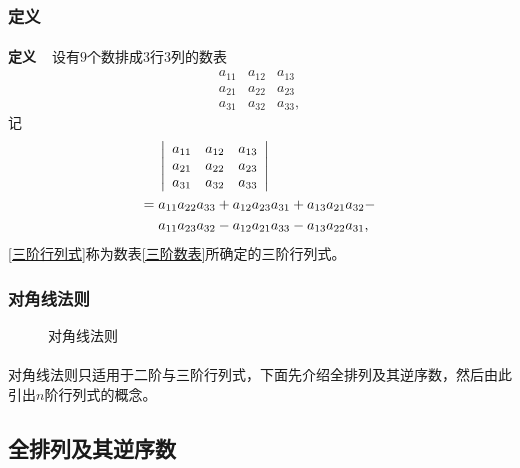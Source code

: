 \subsubsection{定义}
\paragraph{}
\textbf{定义~~}设有$9$个数排成$3$行$3$列的数表
\begin{equation}
  \label{三阶数表}
  \begin{array}{lll}
    a_{11} & a_{12} & a_{13} \\
    a_{21} & a_{22} & a_{23} \\
    a_{31} & a_{32} & a_{33},
  \end{array}
\end{equation}
记
\begin{align}
\centering
  \begin{split}
    \label{三阶行列式}
    &\;\left|\begin{array}{lll}
      a_{11} & a_{12} & a_{13} \\
      a_{21} & a_{22} & a_{23} \\
      a_{31} & a_{32} & a_{33}
    \end{array}\right| \\
    =&\; a_{11}a_{22}a_{33} + a_{12}a_{23}a_{31} + a_{13}a_{21}a_{32} - \\
    &\; a_{11}a_{23}a_{32} - a_{12}a_{21}a_{33} - a_{13}a_{22}a_{31},
  \end{split}
\end{align}
\eqref{三阶行列式}称为数表\eqref{三阶数表}所确定的三阶行列式。

\subsubsection{对角线法则}
\begin{figure}[H]
\centering
  
  \caption{对角线法则}
  \label{图:三阶对角线法则}
\end{figure}

\paragraph{}
对角线法则只适用于二阶与三阶行列式，下面先介绍全排列及其逆序数，然后由此引出$n$阶行列式的概念。

\subsection{全排列及其逆序数}

